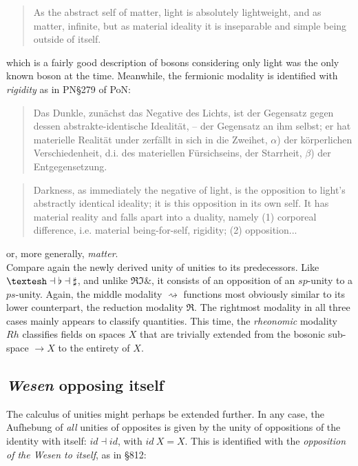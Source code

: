 \documentclass{article}
\begin{document}
\begin{quote}
    As the abstract self of matter, light is absolutely lightweight, and as matter, infinite, but as material ideality it is inseparable and simple being outside of itself. 
\end{quote}

which is a fairly good description of bosons considering only light was the only known boson at the time. Meanwhile, the fermionic modality is identified with \emph{rigidity} as in PN§279 of PoN:

\begin{quote}
    Das Dunkle, zunächst das Negative des Lichts, ist der Gegensatz gegen dessen abstrakte-identische Idealität, – der Gegensatz an ihm selbst; er hat materielle Realität under zerfällt in sich in die Zweihet, $\alpha$) der körperlichen Verschiedenheit, d.i. des materiellen Fürsichseins, der Starrheit, $\beta$) der Entgegensetzung.
\end{quote}

\begin{quote}
    Darkness, as immediately the negative of light, is the opposition to light’s abstractly identical ideality; it is this opposition in its own self. It has material reality and falls apart into a duality, namely (1) corporeal difference, i.e. material being-for-self, rigidity; (2) opposition...
\end{quote}

or, more generally, \emph{matter}. \\

Compare again the newly derived unity of unities to its predecessors. Like $\textrm{\textesh}\dashv\flat\dashv\sharp$, and unlike $\Re\Im\&$, it consists of an opposition of an $sp$-unity to a $ps$-unity. Again, the middle modality $\rightsquigarrow$ functions most obviously similar to its lower counterpart, the reduction modality $\Re$. The rightmost modality in all three cases mainly appears to classify quantities. This time, the \emph{rheonomic} modality $Rh$ classifies fields on spaces $X$ that are trivially extended from the bosonic sub-space $\rightarrow X$ to the entirety of $X$. 


\subsection{\emph{Wesen} opposing itself}\label{Wesen}
The calculus of unities might perhaps be extended further. In any case, the Aufhebung of \emph{all} unities of opposites is given by the unity of oppositions of the identity with itself: $id\dashv id$, with $id\ X=X$. This is identified with the \emph{opposition of the \emph{Wesen} to itself}, as in §812:
\end{document}
